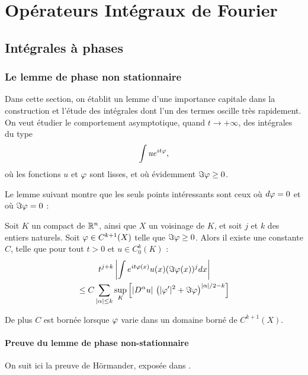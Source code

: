 \chapter{Opérateurs Intégraux de Fourier}

\section{Intégrales à phases}

\subsection{Le lemme de phase non stationnaire}
Dans cette section, on établit un lemme d'une importance capitale dans la
construction et l'étude des intégrales dont l'un des termes oscille très
rapidement. On veut étudier le comportement asymptotique, quand $t \to
+\infty$, des intégrales du type
\begin{equation*}
  \int u e^{it\varphi},
\end{equation*}
\noindent où les fonctions $u$ et $\varphi$ sont lisses, et où évidemment $\Im
\varphi \geq 0$.

Le lemme suivant montre que les seuls points intéressants sont ceux où
$d\varphi=0$ et où $\Im \varphi =0$ :
\begin{lem}
\label{lem:phasenonstat}
Soit $K$ un compact de $\mathbb{R}^n$, ainsi que $X$ un voisinage de $K$, et soit $j$ et
$k$ des entiers naturels. Soit $\varphi \in C^{k+1}(X)$
telle que $\Im \varphi \geq 0$. Alors il existe une constante $C$, telle que
pour tout $t>0$ et $u \in C^k_0(K)$ :
\begin{multline*}
  t^{j+k}\left|\int e^{it\varphi(x)}u(x)(\Im \varphi(x))^j dx\right| \\\leq C
    \sum_{|\alpha| \leq k} \underset{K}{\sup}\left[|D^{\alpha}u|\,\left(|\varphi'|^2 + \Im \varphi\right)^{|\alpha|/2-k}\right]
\end{multline*}

\noindent De plus $C$ est bornée lorsque $\varphi$ varie dans un domaine borné de $C^{k+1}(X)$.
\end{lem}

\subsubsection{Preuve du lemme de phase non-stationnaire}

On suit ici la preuve de Hörmander, exposée dans \cite{hormander2003analysis}.

